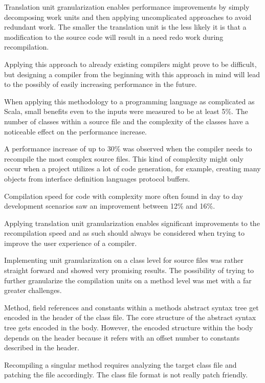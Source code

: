 \documentclass{VUMIFPSbakalaurinis}
\begin{document}
Translation unit granularization enables performance improvements by simply decomposing work units and then applying uncomplicated approaches to avoid redundant work.
The smaller the translation unit is the less likely it is that a modification to the source code will result in a need redo work during recompilation.

Applying this approach to already existing compilers might prove to be difficult, but designing a compiler from the beginning with this approach in mind will lead to the possibly of easily increasing performance in the future.

When applying this methodology to a programming language as complicated as Scala, small benefits even to the inputs were measured to be at least 5\%.
The number of classes within a source file and the complexity of the classes have a noticeable effect on the performance increase.

A performance increase of up to 30\% was observed when the compiler needs to recompile the most complex source files.
This kind of complexity might only occur when a project utilizes a lot of code generation, for example, creating many objects from interface definition languages protocol buffers.

Compilation speed for code with complexity more often found in day to day development scenarios saw an improvement between 12\% and 16\%.

Applying translation unit granularization enables significant improvements to the recompilation speed and as such should always be considered when trying to improve the user experience of a compiler.

\iffalse
{}

Implementing unit granularization on a class level for source files was rather straight forward and showed very promising results.
The possibility of trying to further granularize the compilation units on a method level was met with a far greater challenges.

Method, field references and constants within a methods abstract syntax tree get encoded in the header of the class file.
The core structure of the abstract syntax tree gets encoded in the body.
However, the encoded structure within the body depends on the header because it refers with an offset number to constants described in the header.

Recompiling a singular method requires analyzing the target class file and patching the file accordingly.
The class file format is not really patch friendly.
\end{document}

